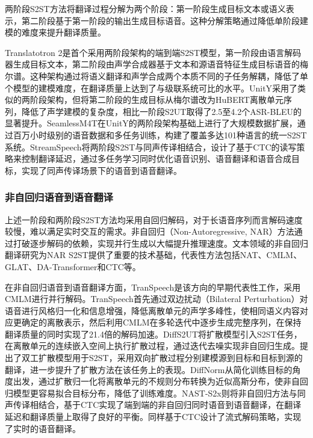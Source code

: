 两阶段S2ST方法将翻译过程分解为两个阶段：第一阶段生成目标文本或语义表示，第二阶段基于第一阶段的输出生成目标语音。这种分解策略通过降低单阶段建模的难度来提升翻译质量。

Translatotron 2\citep{translatotron2}是首个采用两阶段架构的端到端S2ST模型，第一阶段由语言解码器生成目标文本，第二阶段由声学合成器基于文本和源语音特征生成目标语音的梅尔谱。这种架构通过将语义翻译和声学合成两个本质不同的子任务解耦，降低了单个模型的建模难度，在翻译质量上达到了与级联系统可比的水平。UnitY\citep{inaguma-etal-2023-unity}采用了类似的两阶段架构，但将第二阶段的生成目标从梅尔谱改为HuBERT离散单元序列，降低了声学建模的复杂度，相比一阶段S2UT取得了2.5至4.2个ASR-BLEU的显著提升。SeamlessM4T\citep{communication2023seamlessm4t}在UnitY的两阶段架构基础上进行了大规模数据扩展，通过百万小时级别的语音数据和多任务训练，构建了覆盖多达101种语言的统一S2ST系统。StreamSpeech\citep{zhang-etal-2024-streamspeech}将两阶段S2ST与同声传译相结合，设计了基于CTC的读写策略来控制翻译延迟，通过多任务学习同时优化语音识别、语音翻译和语音合成目标，实现了同声传译场景下的语音到语音翻译。

\subsubsection{非自回归语音到语音翻译}\label{sec:rw_s2st_nar}

上述一阶段和两阶段S2ST方法均采用自回归解码，对于长语音序列而言解码速度较慢，难以满足实时交互的需求。非自回归（Non-Autoregressive, NAR）方法通过打破逐步解码的依赖，实现并行生成以大幅提升推理速度。文本领域的非自回归翻译研究为NAR S2ST提供了重要的技术基础，代表性方法包括NAT\citep{gu2018nat}、CMLM\citep{cmlm}、GLAT\citep{qian-etal-2021-glancing}、DA-Transformer\citep{huang2022DATransformer}和CTC\citep{ctc}等。

在非自回归语音到语音翻译方面，TranSpeech\citep{huang2023transpeech}是该方向的早期代表性工作，采用CMLM进行并行解码。TranSpeech首先通过双边扰动（Bilateral Perturbation）对语音进行风格归一化和信息增强，降低离散单元的声学多峰性，使相同语义内容对应更确定的离散表示，然后利用CMLM在多轮迭代中逐步生成完整序列，在保持翻译质量的同时实现了21.4倍的解码加速。DiffS2UT\citep{diffs2ut}将扩散模型引入S2ST任务，在离散单元的连续嵌入空间上执行扩散过程，通过迭代去噪实现非自回归生成。\citet{wu-2023-duplex}提出了双工扩散模型用于S2ST，采用双向扩散过程分别建模源到目标和目标到源的翻译，进一步提升了扩散方法在该任务上的表现。DiffNorm\citep{tan2024diffnorm}从简化训练目标的角度出发，通过扩散归一化将离散单元的不规则分布转换为近似高斯分布，使非自回归模型更容易拟合目标分布，降低了训练难度。NAST-S2x\citep{ma2024nasts2x}则将非自回归方法与同声传译相结合，基于CTC实现了端到端的非自回归同时语音到语音翻译，在翻译延迟和翻译质量上取得了良好的平衡。\citet{zhang2025ctcst}同样基于CTC设计了流式解码策略，实现了实时的语音翻译。

